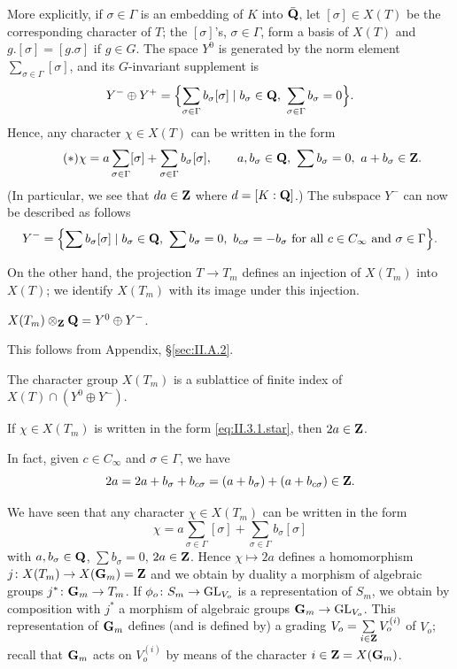 More explicitly, if $\sigma \in \Gamma$ is an embedding of $K$ into
$\bar{\mathbf{Q}}$, let $[\sigma] \in X(T)$ be the corresponding character of
$T$; the $[\sigma]$'s, $\sigma \in \Gamma$, form a basis of $X(T)$ and
$g.[\sigma] = [g.\sigma]$ if $g \in G$.  The space $Y^0$ is generated by
the norm element $\sum\limits_{\sigma \in \Gamma} [\sigma]$, and its
$G$-invariant supplement is
\[
Y^- \oplus Y^+ = \Bigl\{\sum_{\sigma \in \Gamma} b_\sigma[\sigma] \mid
b_\sigma \in \mathbf{Q},\ \sum_{\sigma \in \Gamma} b_\sigma = 0\Bigr\}.
\]
Hence, any character $\chi \in X(T)$ can be written in the form
\begin{equation}
\tag{$*$}\label{eq:II.3.1.star}
\chi = a \sum_{\sigma \in \Gamma} [\sigma] + \sum_{\sigma \in \Gamma}
b_\sigma[\sigma], \qquad a, b_\sigma \in \mathbf{Q},\ \sum b_\sigma = 0,\
a + b_\sigma \in \mathbf{Z}.
\end{equation}
(In particular, we see that $da \in \mathbf{Z}$ where $d = [K : \mathbf{Q}]$.)  The
subspace $Y^-$ can now be described as follows
\[
Y^- = \Bigl\{\sum b_\sigma[\sigma] \mid b_\sigma \in \mathbf{Q},\
\sum b_\sigma = 0,\ b_{c\sigma} = -b_\sigma \text{ for all }
c \in C_\infty \text{ and } \sigma \in \Gamma\Bigr\}.
\]

On the other hand, the projection $T \to T_m$ defines an injection of
$X(T_m)$ into $X(T)$; we identify $X(T_m)$ with its image under this
injection.

\begin{proposition}\label{prop:II.3.1.1}
$X(T_m) \mathbin{\otimes}_{\mathbf{Z}} \mathbf{Q} = Y^0 \oplus Y^-$.
\end{proposition}

This follows from Appendix, \S\ref{sec:II.A.2}.

\begin{corollary}[1]\label{cor:II.3.1.1}
The character group $X(T_m)$ is a sublattice of finite index of
$X(T) \cap (Y^0 \oplus Y^-)$.
\end{corollary}

\begin{corollary}[2]\label{cor:II.3.1.2}
If $\chi \in X(T_m)$ is written in the form \eqref{eq:II.3.1.star}, then
$2a \in \mathbf{Z}$.
\end{corollary}

In fact, given $c \in C_\infty$ and $\sigma \in \Gamma$, we have
\[
2a = 2a + b_\sigma + b_{c\sigma} = (a + b_\sigma) + (a + b_{c\sigma})
\in \mathbf{Z}.
\]


We have seen that any character $\chi \in X(T_m)$ can be written in the
form
\[
\chi = a \sum_{\sigma \in \Gamma} [\sigma] + \sum_{\sigma \in \Gamma}
b_\sigma[\sigma]
\]
with $a, b_\sigma \in \mathbf{Q}$, $\sum b_\sigma = 0$, $2a \in \mathbf{Z}$.  Hence
$\chi \mapsto 2a$ defines a homomorphism
$j\colon X(T_m) \to X(\mathbf{G}_m) = \mathbf{Z}$ and we obtain by duality a morphism of
algebraic groups $j^*\colon \mathbf{G}_m \to T_m$.  If
$\phi_o\colon S_m \to \mathrm{GL}_{V_o}$ is a representation of $S_m$, we obtain
by composition with $j^*$ a morphism of algebraic groups
$\mathbf{G}_m \to \mathrm{GL}_{V_o}$.  This representation of $\mathbf{G}_m$ defines (and is
defined by) a grading $V_o = \sum\limits_{i \in \mathbf{Z}} V_o^{(i)}$ of $V_o$;
recall that $\mathbf{G}_m$ acts on $V_o^{(i)}$ by means of the character
$i \in \mathbf{Z} = X(\mathbf{G}_m)$.


